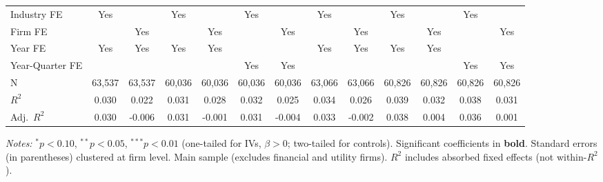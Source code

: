 \documentclass[11pt,a4paper]{article}
\begin{document}
\begin{table}[htbp]
\begin{tabular}{lcccccccccccc}
Industry FE & Yes &  & Yes &  & Yes &  & Yes &  & Yes &  & Yes &  \\
Firm FE &  & Yes &  & Yes &  & Yes &  & Yes &  & Yes &  & Yes \\
Year FE & Yes & Yes & Yes & Yes &  &  & Yes & Yes & Yes & Yes &  &  \\
Year-Quarter FE &  &  &  &  & Yes & Yes &  &  &  &  & Yes & Yes \\
\midrule
N & 63,537 & 63,537 & 60,036 & 60,036 & 60,036 & 60,036 & 63,066 & 63,066 & 60,826 & 60,826 & 60,826 & 60,826 \\
$R^2$ & 0.030 & 0.022 & 0.031 & 0.028 & 0.032 & 0.025 & 0.034 & 0.026 & 0.039 & 0.032 & 0.038 & 0.031 \\
Adj.~$R^2$ & 0.030 & -0.006 & 0.031 & -0.001 & 0.031 & -0.004 & 0.033 & -0.002 & 0.038 & 0.004 & 0.036 & 0.001 \\
\bottomrule
\end{tabular}
\begin{minipage}{\linewidth}
\vspace{2pt}\scriptsize
\textit{Notes:} $^{*}p<0.10$, $^{**}p<0.05$, $^{***}p<0.01$ (one-tailed for IVs, $\beta > 0$; two-tailed for controls).
 Significant coefficients in \textbf{bold}.
 Standard errors (in parentheses) clustered at firm level.
 Main sample (excludes financial and utility firms).
 $R^2$ includes absorbed fixed effects (not within-$R^2$).
\end{minipage}
\end{table}
\clearpage
\end{document}

